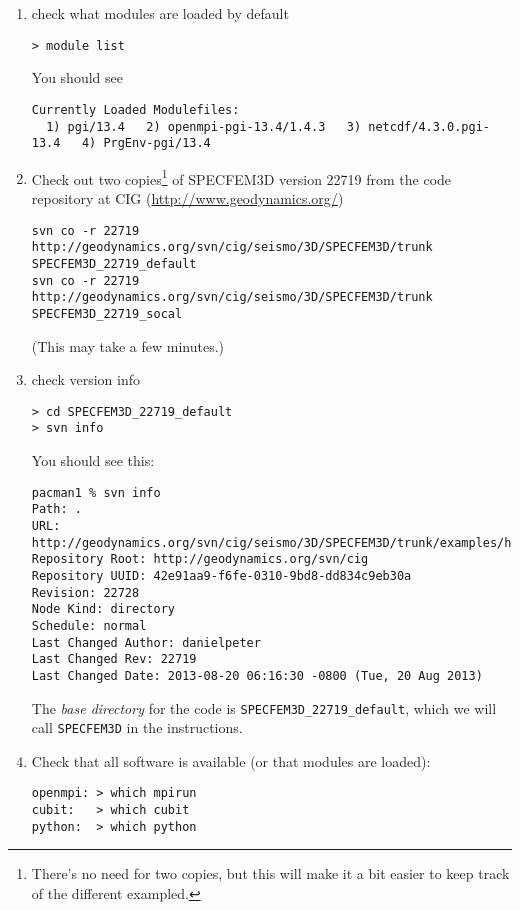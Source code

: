 \documentclass[10pt,fleqn,letterpaper]{article}
\begin{document}
\begin{enumerate}
\item check what modules are loaded by default
\begin{verbatim}
> module list
\end{verbatim}

You should see
\begin{verbatim}
Currently Loaded Modulefiles:
  1) pgi/13.4   2) openmpi-pgi-13.4/1.4.3   3) netcdf/4.3.0.pgi-13.4   4) PrgEnv-pgi/13.4
\end{verbatim}

\item Check out two copies\footnote{There's no need for two copies, but this will make it a bit easier to keep track of the different exampled.} of SPECFEM3D version 22719 from the code repository at CIG (\url{http://www.geodynamics.org/})
%
\begin{verbatim}
svn co -r 22719 http://geodynamics.org/svn/cig/seismo/3D/SPECFEM3D/trunk SPECFEM3D_22719_default
svn co -r 22719 http://geodynamics.org/svn/cig/seismo/3D/SPECFEM3D/trunk SPECFEM3D_22719_socal
\end{verbatim}
%
(This may take a few minutes.)

\item check version info
%
\begin{verbatim}
> cd SPECFEM3D_22719_default
> svn info
\end{verbatim}

You should see this:
\begin{verbatim}
pacman1 % svn info
Path: .
URL: http://geodynamics.org/svn/cig/seismo/3D/SPECFEM3D/trunk/examples/homogeneous_halfspace_HEX8_elastic_absorbing_Stacey_5sides
Repository Root: http://geodynamics.org/svn/cig
Repository UUID: 42e91aa9-f6fe-0310-9bd8-dd834c9eb30a
Revision: 22728
Node Kind: directory
Schedule: normal
Last Changed Author: danielpeter
Last Changed Rev: 22719
Last Changed Date: 2013-08-20 06:16:30 -0800 (Tue, 20 Aug 2013)
\end{verbatim}

The {\em base directory} for the code is \verb+SPECFEM3D_22719_default+, which we will call \verb+SPECFEM3D+ in the instructions.

\item Check that all software is available (or that modules are loaded):
\begin{verbatim}
openmpi: > which mpirun
cubit:   > which cubit
python:  > which python
\end{verbatim}


\end{enumerate}
\end{document}
